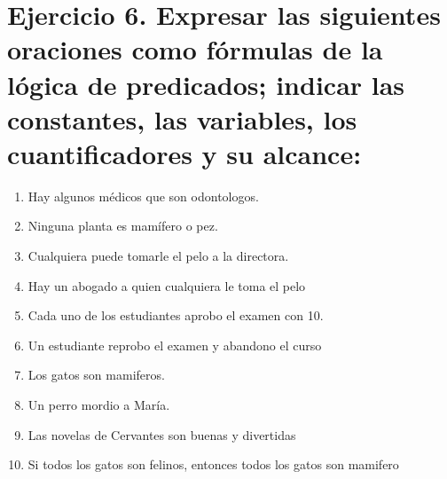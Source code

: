 \chapter*{Ejercicio 6. Expresar las siguientes oraciones como fórmulas de la lógica de predicados; indicar las constantes, las variables, los cuantificadores y su alcance:}
\vspace{-20px}
\begin{multicols}{2}
	\noindent
	\begin{enumerate}[label=\alph*)]
		\item Hay algunos médicos que son odontologos.
		\item Ninguna planta es mamífero o pez.
		\item Cualquiera puede tomarle el pelo a la directora.
		\item Hay un abogado a quien cualquiera le toma el pelo
		\item Cada uno de los estudiantes aprobo el examen con 10.
		\item Un estudiante reprobo el examen y abandono el curso
		\item Los gatos son mamiferos.
		\item Un perro mordio a María.
		\item Las novelas de Cervantes son buenas y divertidas
		\item Si todos los gatos son felinos, entonces todos los gatos son mamifero
	\end{enumerate}
\end{multicols}
